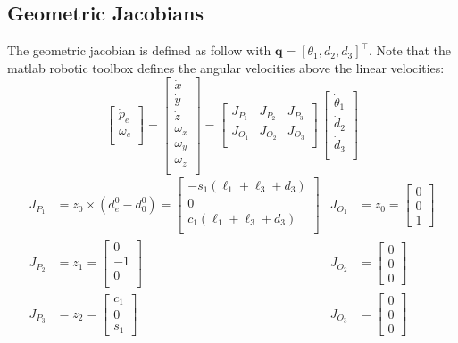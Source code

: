 \documentclass[a4paper,12pt]{article}
\renewcommand*{\t}{\theta}
\renewcommand*{\l}{\ell}
\newcommand*{\q}{\bm{q}}
\begin{document}
\subsection{Geometric Jacobians}
The geometric jacobian is defined as follow with $\q = [\t_1,   d_2,   d_3]^\top$. Note that the matlab robotic toolbox defines the angular velocities above the linear velocities:
\[
\begin{bmatrix}
    \dot{p}_e \\
    \omega_e \\
\end{bmatrix}
 =
\begin{bmatrix}
    \dot{x} \\
    \dot{y} \\
    \dot{z} \\
    \omega_x \\
    \omega_y \\
    \omega_z \\
\end{bmatrix}
 =
\left[
\begin{array}{c|c|c}
    J_{P_1} & J_{P_2} & J_{P_3} \\
    J_{O_1} & J_{O_2} & J_{O_3} \\
\end{array}
\right]
\,
\begin{bmatrix}
    \dot{\t}_1 \\
    \dot{d}_2 \\
    \dot{d}_3 \\
\end{bmatrix}
\]
\begin{align*}
J_{P_1} &= z_0 \times (d^0_e  -  d^0_0) = \begin{bmatrix}
    -s_1(\l_1 + \l_3 + d_3) \\
    0 \\
    c_1(\l_1 + \l_3 + d_3) \\
\end{bmatrix} 
&
J_{O_1} &= z_0 = \begin{bmatrix}0\\0\\1\end{bmatrix}
\\
J_{P_2} &= z_1 = \begin{bmatrix}
     0 \\
     -1 \\
     0 \\
\end{bmatrix} 
&
J_{O_2} &= \begin{bmatrix}0\\0\\0\end{bmatrix}
\\
J_{P_3} &= z_2 = \begin{bmatrix}
    c_1\\
    0\\
    s_1
\end{bmatrix}
&
J_{O_3} &= \begin{bmatrix}0\\0\\0\end{bmatrix}
\end{align*}
\end{document}
